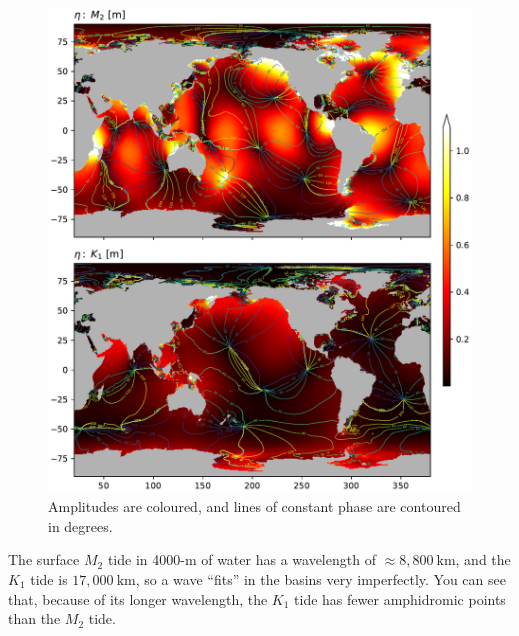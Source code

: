 \begin{figure}[hbt]
  \begin{center}
    \includegraphics[width=5in]{figs/Waves/TidalAmplitudes}
    \caption{Amplitudes are coloured, and lines of constant phase are contoured in degrees. }
    \label{fig:TidalAmplitudes}  
  \end{center}
\end{figure}

The surface $M_2$ tide in 4000-m of water has a wavelength of $\approx8,800\ \mathrm{km}$, and the $K_1$ tide is $17,000\ \mathrm{km}$, so a wave ``fits'' in the basins very imperfectly.  You can see that, because of its longer wavelength, the $K_1$ tide has fewer amphidromic points than the $M_2$ tide.  



 
